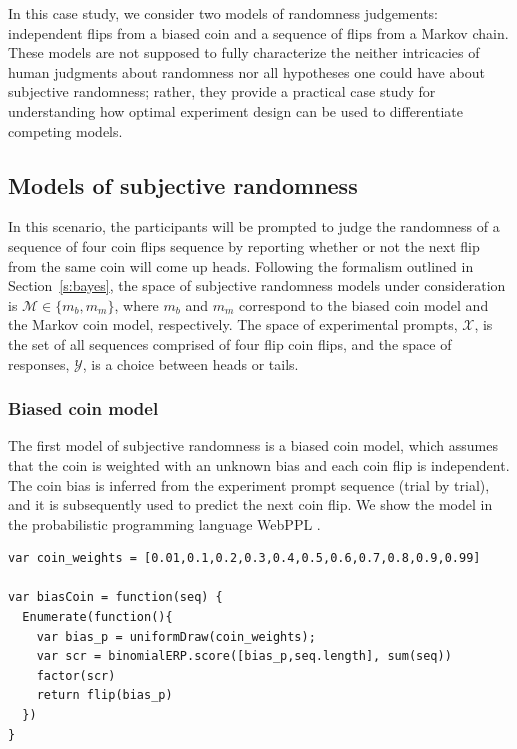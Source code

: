 \documentclass{article}
\begin{document}
In this case study, we consider two models of randomness judgements: independent flips from a biased coin and a sequence of flips from a Markov chain. These models are not supposed to fully characterize the neither intricacies of human judgments about randomness nor all hypotheses one could have about subjective randomness; rather, they provide a practical case study for understanding how optimal experiment design can be used to differentiate competing models.

\subsection{Models of subjective randomness}
\label{s:tutorial:ss:randomness}

In this scenario, the participants will be prompted to judge the randomness of a sequence of four coin flips sequence by reporting whether or not the next flip from the same coin will come up heads. Following the formalism outlined in Section~\ref{s:bayes}, the space of subjective randomness models under consideration is $\mathcal{M} \in \{m_b, m_m\}$, where $m_b$ and $m_m$ correspond to the biased coin model and the Markov coin model, respectively. The space of experimental prompts, $\mathcal{X}$, is the set of all sequences comprised of four flip coin flips, and the space of responses, $\mathcal{Y}$, is a choice between heads or tails.

\subsubsection{Biased coin model}
\label{s:tutorial:sss:biased}

The first model of subjective randomness is a biased coin model, which assumes that the coin is weighted with an unknown bias and each coin flip is independent. The coin bias is inferred from the experiment prompt sequence (trial by trial), and it is subsequently used to predict the next coin flip. We show the model in the probabilistic programming language WebPPL \cite{dippl}.

\begin{lstlisting}[caption=Biased coin model]
var coin_weights = [0.01,0.1,0.2,0.3,0.4,0.5,0.6,0.7,0.8,0.9,0.99]

var biasCoin = function(seq) {
  Enumerate(function(){
    var bias_p = uniformDraw(coin_weights);
    var scr = binomialERP.score([bias_p,seq.length], sum(seq))
    factor(scr)
    return flip(bias_p)
  })
}
\end{lstlisting}
\end{document}
